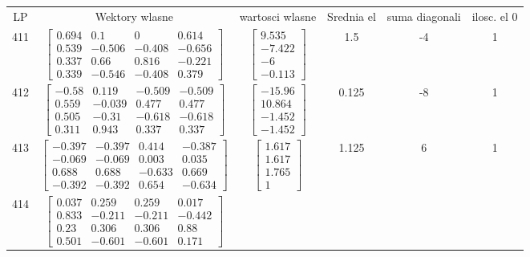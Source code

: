 \documentclass[a4paper,12pt]{article}
\begin{document}
\bgroup {} \vspace{0.2in} \begin{tabular}{c c c c c c}
LP &Wektory wlasne & wartosci wlasne & Srednia el & suma diagonali & ilosc. el 0\\
411
&
$\begin{bmatrix} 0.694 & 0.1 & 0 & 0.614 \\ 0.539 & -0.506 & -0.408 & -0.656 \\ 0.337 & 0.66 & 0.816 & -0.221 \\ 0.339 & -0.546 & -0.408 & 0.379 \end{bmatrix}$
&
$\begin{bmatrix} 9.535 \\ -7.422 \\ -6 \\ -0.113 \end{bmatrix}$
&
1.5
&
-4
&
1
\\
412
&
$\begin{bmatrix} -0.58 & 0.119 & -0.509 & -0.509 \\ 0.559 & -0.039 & 0.477 & 0.477 \\ 0.505 & -0.31 & -0.618 & -0.618 \\ 0.311 & 0.943 & 0.337 & 0.337 \end{bmatrix}$
&
$\begin{bmatrix} -15.96 \\ 10.864 \\ -1.452 \\ -1.452 \end{bmatrix}$
&
0.125
&
-8
&
1
\\
413
&
$\begin{bmatrix} -0.397 & -0.397 & 0.414 & -0.387 \\ -0.069 & -0.069 & 0.003 & 0.035 \\ 0.688 & 0.688 & -0.633 & 0.669 \\ -0.392 & -0.392 & 0.654 & -0.634 \end{bmatrix}$
&
$\begin{bmatrix} 1.617 \\ 1.617 \\ 1.765 \\ 1 \end{bmatrix}$
&
1.125
&
6
&
1
\\
414
&
$\begin{bmatrix} 0.037 & 0.259 & 0.259 & 0.017 \\ 0.833 & -0.211 & -0.211 & -0.442 \\ 0.23 & 0.306 & 0.306 & 0.88 \\ 0.501 & -0.601 & -0.601 & 0.171 \end{bmatrix}$

\end{tabular}
\end{document}
